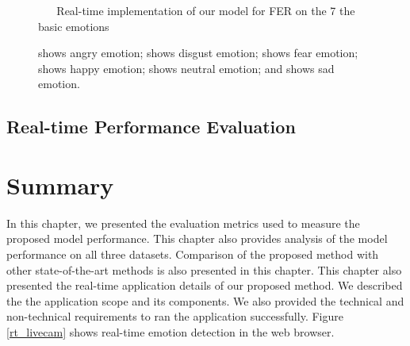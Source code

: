 \documentclass[master]{thesis-uestc}
\begin{document}
\begin{figure}
%
\hspace{8pt}%

\caption{\,\,\,\,\,\,\,\,\,\,Real-time implementation of our model for FER on the 7 the basic emotions}
\caption*{
 shows angry emotion;
 shows disgust emotion;
 shows fear emotion;
 shows happy emotion;
 shows neutral emotion; and
 shows sad emotion.}
\label{fig:implementation}%
\end{figure}

\subsection*{Real-time Performance Evaluation}

\section{Summary}
In this chapter, we presented the evaluation metrics used to measure the proposed model performance. This chapter also provides analysis of the model performance on all three datasets. Comparison of the proposed method with other state-of-the-art methods is also presented in this chapter. This chapter also presented the real-time application details of our proposed method. We described the the application scope and its components. We also provided the technical and non-technical requirements to ran the application successfully. Figure \ref{rt_livecam} shows real-time emotion detection in the web browser.
\end{document}
